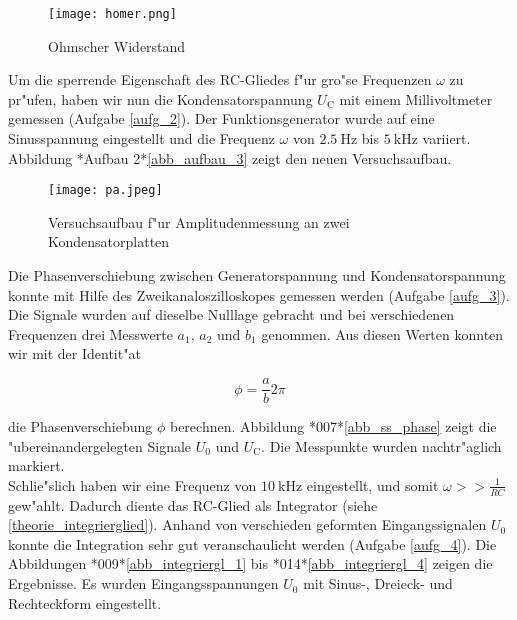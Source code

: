 \documentclass{scrartcl}
\begin{document}
			\begin{figure}[ht]
				\centering
				\texttt{[image: homer.png]}
					\caption {Ohmscher Widerstand}
			\end{figure}

			Um die sperrende Eigenschaft des RC-Gliedes f"ur gro"se Frequenzen $\omega$ zu pr"ufen, haben wir nun die Kondensatorspannung $U_{\mathrm{C}}$ mit einem Millivoltmeter gemessen (Aufgabe \ref{aufg_2}).
			Der Funktions\-generator wurde auf eine Sinusspannung eingestellt und die Frequenz $\omega$ von $\SI{2.5}{\hertz}$ bis $\SI{5}{\kilo\hertz}$ variiert. Abbildung *Aufbau 2*\ref{abb_aufbau_3} zeigt den neuen Versuchsaufbau. \\

			\begin{figure}[ht]
				\centering
				\texttt{[image: pa.jpeg]}
					\caption {Versuchsaufbau f"ur Amplitudenmessung an zwei Kondensatorplatten}
			\end{figure}

			Die Phasenverschiebung zwischen Generatorspannung und Kondensatorspannung konnte mit Hilfe des Zweikanaloszilloskopes gemessen werden (Aufgabe \ref{aufg_3}).
			Die Signale wurden auf dieselbe Nulllage gebracht und bei verschiedenen Frequenzen drei Messwerte $a_1$, $a_2$ und $b_1$ genommen.
			Aus diesen Werten konnten wir mit der Identit"at

			\begin{equation}
				\phi = \frac{a}{b} 2 \pi
			\end{equation}

			die Phasenverschiebung $\phi$ berechnen.
			Abbildung *007*\ref{abb_ss_phase} zeigt die "ubereinandergelegten Signale $U_0$ und $U_{\mathrm{C}}$. Die Messpunkte wurden nachtr"aglich markiert.\\

			Schlie"slich haben wir eine Frequenz von $\SI{10}{\kilo\hertz}$ eingestellt, und somit $\omega >> \frac{1}{RC}$ gew"ahlt.
			Dadurch diente das RC-Glied als Integrator (siehe \ref{theorie_integrierglied}).
			Anhand von verschieden geformten Eingangssignalen $U_0$ konnte die Integration sehr gut veranschaulicht werden (Aufgabe \ref{aufg_4}).
			Die Abbildungen *009*\ref{abb_integriergl_1} bis *014*\ref{abb_integriergl_4} zeigen die Ergebnisse.
			Es wurden Eingangsspannungen $U_0$ mit Sinus-, Dreieck- und Rechteckform eingestellt.
\end{document}
